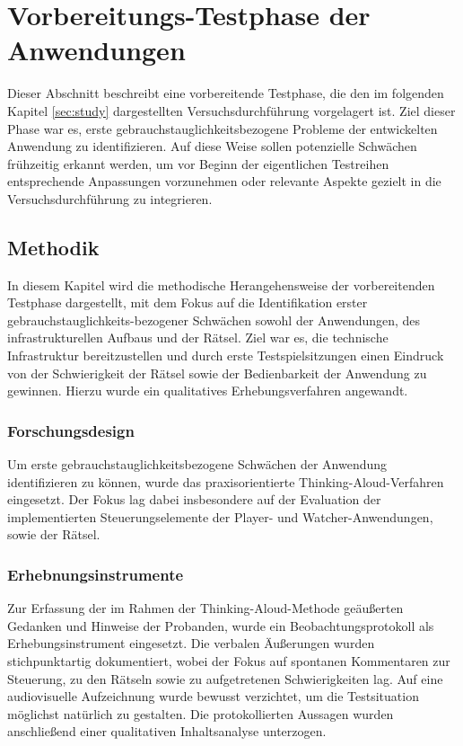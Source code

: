 \chapter{Vorbereitungs-Testphase der Anwendungen}\label{sec:pre-study}

Dieser Abschnitt beschreibt eine vorbereitende Testphase, die den im folgenden Kapitel  \ref{sec:study} dargestellten Versuchsdurchführung vorgelagert ist. Ziel dieser Phase war es, erste
gebrauchstauglichkeitsbezogene Probleme der entwickelten Anwendung zu identifizieren. Auf diese Weise sollen potenzielle Schwächen frühzeitig erkannt werden, um vor Beginn der eigentlichen Testreihen entsprechende Anpassungen vorzunehmen oder relevante Aspekte gezielt in die Versuchsdurchführung zu integrieren.

\section{Methodik}
In diesem Kapitel wird die methodische Herangehensweise der vorbereitenden Testphase dargestellt, mit dem Fokus auf die Identifikation erster gebrauchstauglichkeits-bezogener Schwächen sowohl der Anwendungen, des infrastrukturellen Aufbaus und der Rätsel. Ziel war es, die technische Infrastruktur bereitzustellen und durch erste Testspielsitzungen einen Eindruck von der Schwierigkeit der Rätsel sowie der Bedienbarkeit der Anwendung zu gewinnen. Hierzu wurde ein qualitatives Erhebungsverfahren angewandt.

\subsection{Forschungsdesign}

Um erste gebrauchstauglichkeitsbezogene Schwächen der Anwendung identifizieren zu können, wurde das praxisorientierte Thinking-Aloud-Verfahren eingesetzt. Der Fokus lag dabei insbesondere auf der Evaluation der implementierten Steuerungselemente der Player- und Watcher-Anwendungen, sowie der Rätsel.

\subsection{Erhebnungsinstrumente}

Zur Erfassung der im Rahmen der Thinking-Aloud-Methode geäußerten Gedanken und Hinweise der Probanden, wurde ein Beobachtungsprotokoll als Erhebungsinstrument eingesetzt. Die verbalen Äußerungen wurden stichpunktartig dokumentiert, wobei der Fokus auf spontanen Kommentaren zur Steuerung, zu den Rätseln sowie zu aufgetretenen  Schwierigkeiten lag. Auf eine audiovisuelle Aufzeichnung wurde bewusst verzichtet, um die Testsituation möglichst natürlich zu gestalten. Die protokollierten Aussagen wurden anschließend einer qualitativen Inhaltsanalyse unterzogen.

